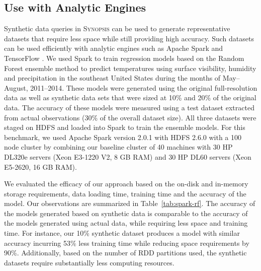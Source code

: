 \subsection{Use with Analytic Engines}
Synthetic data queries in \textsc{Synopsis} can be used to generate representative datasets that require less space while still providing high accuracy.  
Such datasets can be used efficiently with analytic engines such as Apache Spark \cite{zaharia2010spark} and TensorFlow \cite{tensorflow}.  
We used Spark to train regression models based on the Random Forest ensemble method to predict temperatures using surface visibility, humidity and precipitation in the southeast United States during the months of May--August, 2011--2014.
These models were generated using the original full-resolution data as well as synthetic data sets that were sized at 10\% and 20\% of the original data.
The accuracy of these models were measured using a test dataset extracted from actual observations (30\% of the overall dataset size).
All three datasets were staged on HDFS and loaded into Spark to train the ensemble models.
For this benchmark, we used Apache Spark version 2.0.1 with HDFS 2.6.0 with a 100 node cluster by combining our baseline cluster of 40 machines with 30 HP DL320e servers (Xeon E3-1220 V2, 8 GB RAM) and 30 HP DL60 servers (Xeon E5-2620, 16 GB RAM). 

We evaluated the efficacy of our approach based on the on-disk and in-memory storage requirements, data loading time, training time and the accuracy of the model.
Our observations are summarized in Table~\ref{tab:spark-rf}.
The accuracy of the models generated based on synthetic data is comparable to the accuracy of the models generated using actual data, while requiring less space and training time.
For instance, our 10\% synthetic dataset produces a model with similar accuracy incurring 53\% less training time while reducing space requirements by 90\%. Additionally, based on the number of RDD partitions used, the synthetic datasets require substantially less computing resources.

